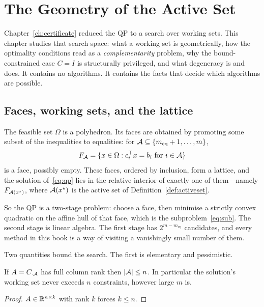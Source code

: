 \chapter{The Geometry of the Active Set}
\label{ch:geometry}

Chapter~\ref{ch:certificate} reduced the QP to a search over working sets. This
chapter studies that search space: what a working set is geometrically, how the
optimality conditions read as a \emph{complementarity} problem, why the
bound-constrained case $C = I$ is structurally privileged, and what degeneracy is
and does. It contains no algorithms. It contains the facts that decide which
algorithms are possible.

\section{Faces, working sets, and the lattice}

The feasible set $\Omega$ is a polyhedron. Its faces are obtained by promoting
some subset of the inequalities to equalities: for
$\mathcal{A} \subseteq \{m_{\mathrm{eq}}+1,\dots,m\}$,
\[
  F_{\mathcal{A}} = \{x \in \Omega : c_i^{\top} x = b_i \text{ for } i \in \mathcal{A}\}
\]
is a face, possibly empty. These faces, ordered by inclusion, form a lattice, and
the solution of~\eqref{eq:qp} lies in the relative interior of exactly one of
them---namely $F_{\mathcal{A}(x^\star)}$, where $\mathcal{A}(x^\star)$ is the active set
of Definition~\ref{def:activeset}.

So the QP is a two-stage problem: choose a face, then minimise a strictly convex
quadratic on the affine hull of that face, which is the subproblem~\eqref{eq:sub}.
The second stage is linear algebra. The first stage has
$2^{m - m_{\mathrm{eq}}}$ candidates, and every method in this book is a way of
visiting a vanishingly small number of them.

Two quantities bound the search. The first is elementary and pessimistic.

\begin{proposition}
\label{prop:worksize}
If $A = C_{\cdot\mathcal{A}}$ has full column rank then $|\mathcal{A}| \le n$. In
particular the solution's working set never exceeds $n$ constraints, however
large $m$ is.
\end{proposition}

\begin{proof}
$A \in \mathbb{R}^{n\times k}$ with rank $k$ forces $k \le n$.
\end{proof}

